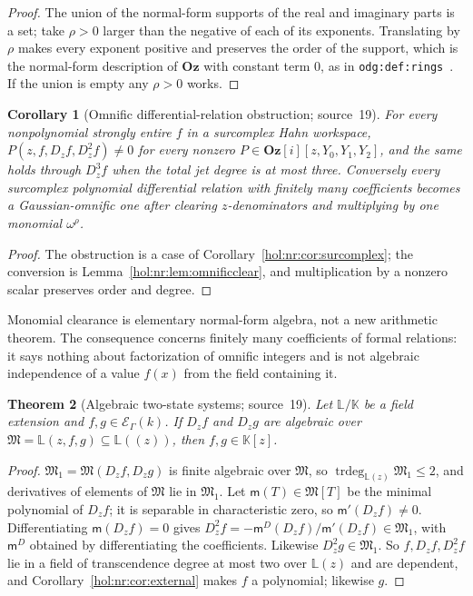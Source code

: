 \documentclass[11pt]{article}
\numberwithin{equation}{section}
\newtheorem{theorem}{Theorem}[section]
\newtheorem{corollary}[theorem]{Corollary}
\theoremstyle{definition}
\theoremstyle{remark}
\newcommand{\KK}{\mathbb K}
\newcommand{\EK}{\mathcal E_\Gamma(k)}
\newcommand{\trdeg}{\operatorname{trdeg}}
\newcommand{\Oz}{\mathbf{Oz}}
\begin{document}
\begin{proof}
The union of the normal-form supports of the real and imaginary parts is a
set; take $\rho>0$ larger than the negative of each of its exponents.
Translating by $\rho$ makes every exponent positive and preserves the order of
the support, which is the normal-form description of $\Oz$ with constant term
$0$, as in \texttt{odg:def:rings}~\cite{repoodg}. If the union is empty any
$\rho>0$ works.
\end{proof}

\begin{corollary}[Omnific differential-relation obstruction; source~19]
\label{hol:nr:cor:omnific}
For every nonpolynomial strongly entire $f$ in a surcomplex Hahn workspace,
$P(z,f,D_zf,D_z^2f)\ne0$ for every nonzero $P\in\Oz[i][z,Y_0,Y_1,Y_2]$, and the
same holds through $D_z^3f$ when the total jet degree is at most three.
Conversely every surcomplex polynomial differential relation with finitely
many coefficients becomes a Gaussian-omnific one after clearing
$z$-denominators and multiplying by one monomial $\omega^\rho$.
\end{corollary}

\begin{proof}
The obstruction is a case of Corollary~\ref{hol:nr:cor:surcomplex}; the
conversion is Lemma~\ref{hol:nr:lem:omnificclear}, and multiplication by a
nonzero scalar preserves order and degree.
\end{proof}

Monomial clearance is elementary normal-form algebra, not a new arithmetic
theorem. The consequence concerns finitely many coefficients of formal
relations: it says nothing about factorization of omnific integers and is not
algebraic independence of a value $f(x)$ from the field containing it.

\begin{theorem}[Algebraic two-state systems; source~19]
\label{hol:nr:thm:systems}
Let $\mathbb L/\KK$ be a field extension and $f,g\in\EK$. If $D_zf$ and $D_zg$
are algebraic over $\mathfrak M=\mathbb L(z,f,g)\subseteq\mathbb L((z))$, then
$f,g\in\KK[z]$.
\end{theorem}

\begin{proof}
$\mathfrak M_1=\mathfrak M(D_zf,D_zg)$ is finite algebraic over $\mathfrak M$,
so $\trdeg_{\mathbb L(z)}\mathfrak M_1\le2$, and derivatives of elements of
$\mathfrak M$ lie in $\mathfrak M_1$. Let $\mathsf m(T)\in\mathfrak M[T]$ be the
minimal polynomial of $D_zf$; it is separable in characteristic zero, so
$\mathsf m'(D_zf)\ne0$. Differentiating $\mathsf m(D_zf)=0$ gives
$D_z^2f=-\mathsf m^{D}(D_zf)/\mathsf m'(D_zf)\in\mathfrak M_1$, with
$\mathsf m^D$ obtained by differentiating the coefficients. Likewise
$D_z^2g\in\mathfrak M_1$. So $f,D_zf,D_z^2f$ lie in a field of transcendence
degree at most two over $\mathbb L(z)$ and are dependent, and
Corollary~\ref{hol:nr:cor:external} makes $f$ a polynomial; likewise $g$.
\end{proof}
\end{document}
